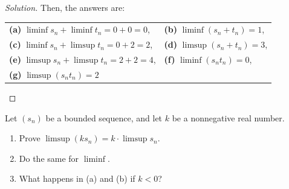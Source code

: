 \documentclass[11pt]{scrartcl}
\providecommand{\ii}{\item}
\theoremstyle{problem}
\newenvironment{problem}[1]
{\renewcommand\theinnercustomthm{#1}\innercustomthm}
{\endinnercustomthm}
\theoremstyle{remark}
\newenvironment{soln}{\begin{proof}[Solution]}{\end{proof}}
\begin{document}
\begin{soln}
	Then, the answers are:
	
	\begin{tabularx}{\linewidth}{XX}
		{\textbf{(a)}} $\liminf s_n + \liminf t_n = 0 + 0 = 0$, &
		{\textbf{(b)}} $\liminf(s_n + t_n) = 1$,\\
		{\textbf{(c)}} $\liminf s_n + \limsup t_n = 0 + 2 = 2$, &
		{\textbf{(d)}} $\limsup(s_n + t_n) = 3$,\\
		{\textbf{(e)}} $\limsup s_n + \limsup t_n = 2 + 2 = 4$, &
		{\textbf{(f)}} $\liminf(s_nt_n) = 0$,\\
		{\textbf{(g)}} $\limsup(s_nt_n) = 2$ &
	\end{tabularx}
\end{soln}


\begin{problem}{12.6}
	Let $(s_n)$ be a bounded sequence, and let $k$ be a nonnegative real number.
	\begin{enumerate}[\textbf{(\alph*)}]
		\ii Prove $\limsup(ks_n) = k\cdot \limsup s_n$.
		\ii Do the same for $\liminf$.
		\ii What happens in (a) and (b) if $k < 0$?
	\end{enumerate}
\end{problem}
\end{document}
